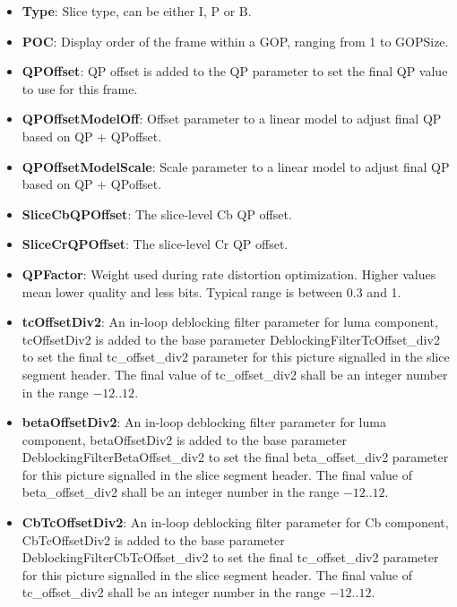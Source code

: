 \documentclass[a4paper,11pt]{jvetdoc}
\begin{document}
\begin{itemize}
\item[]\textbf{Type}: Slice type, can be either I, P or B.

\item[]\textbf{POC}: Display order of the frame within a GOP, ranging
from 1 to GOPSize.

\item[]\textbf{QPOffset}: QP offset is added to the QP parameter to set
the final QP value to use for this frame.

\item[]\textbf{QPOffsetModelOff}: Offset parameter to a linear model to adjust final QP based on QP + QPoffset.

\item[]\textbf{QPOffsetModelScale}: Scale parameter to a linear model to adjust final QP based on QP + QPoffset.

\item[]\textbf{SliceCbQPOffset}: The slice-level Cb QP offset.

\item[]\textbf{SliceCrQPOffset}: The slice-level Cr QP offset.

\item[]\textbf{QPFactor}: Weight used during rate distortion
optimization. Higher values mean lower quality and less bits. Typical
range is between
0.3 and 1.

\item[]\textbf{tcOffsetDiv2}: An in-loop deblocking filter parameter for luma component, tcOffsetDiv2 
is added to the base parameter DeblockingFilterTcOffset_div2 to set the final tc_offset_div2 
parameter for this picture signalled in the slice segment header. The final 
value of tc_offset_div2 shall be an integer number in the range $-12..12$.

\item[]\textbf{betaOffsetDiv2}: An in-loop deblocking filter parameter for luma component, betaOffsetDiv2 
is added to the base parameter DeblockingFilterBetaOffset_div2 to set the final beta_offset_div2 
parameter for this picture signalled in the slice segment header. The final 
value of beta_offset_div2 shall be an integer number in the range $-12..12$.

\item[]\textbf{CbTcOffsetDiv2}: An in-loop deblocking filter parameter for Cb component, CbTcOffsetDiv2 
is added to the base parameter DeblockingFilterCbTcOffset_div2 to set the final tc_offset_div2 
parameter for this picture signalled in the slice segment header. The final 
value of tc_offset_div2 shall be an integer number in the range $-12..12$.


\end{itemize}
\end{document}
